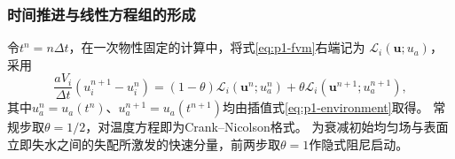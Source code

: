 \subsubsection{时间推进与线性方程组的形成}

令$t^n=n\Delta t$，在一次物性固定的计算中，将式\eqref{eq:p1-fvm}右端记为
$\mathcal L_i(\boldsymbol u;u_a)$，采用
\begin{equation}
  \frac{aV_i}{\Delta t}(u_i^{n+1}-u_i^n)
  =(1-\theta)\mathcal L_i(\boldsymbol u^n;u_a^n)
    +\theta\mathcal L_i(\boldsymbol u^{n+1};u_a^{n+1}),
  \label{eq:p1-time}
\end{equation}
其中$u_a^n=u_a(t^n)$、$u_a^{n+1}=u_a(t^{n+1})$均由插值式\eqref{eq:p1-environment}取得。
常规步取$\theta=1/2$，对温度方程即为Crank--Nicolson格式\cite{cn}。
为衰减初始均匀场与表面立即失水之间的失配所激发的快速分量，前两步取$\theta=1$作隐式阻尼启动。

